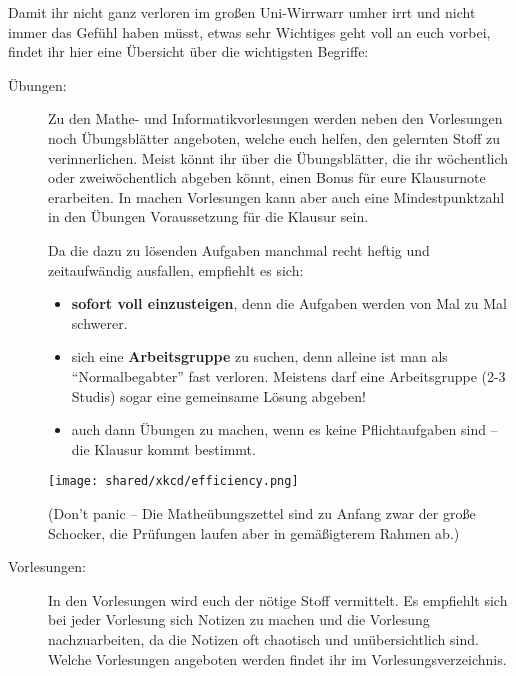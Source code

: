 Damit ihr nicht ganz verloren im gro\ss en Uni-Wirrwarr umher irrt und
  nicht immer das Gefühl haben müsst, etwas sehr Wichtiges geht
  voll an euch vorbei, findet ihr hier eine Übersicht über die wichtigsten Begriffe:

\begin{description}

\item [Übungen:] Zu den Mathe- und Informatikvorlesungen werden neben den Vorlesungen noch Übungsblätter angeboten, welche euch helfen, den gelernten Stoff zu verinnerlichen. Meist könnt ihr über die Übungsblätter, die ihr wöchentlich oder zweiwöchentlich abgeben könnt, einen Bonus für eure Klausurnote erarbeiten. In machen Vorlesungen kann aber auch eine Mindestpunktzahl in den Übungen Voraussetzung für die Klausur sein.

Da die dazu zu lösenden Aufgaben manchmal recht heftig und zeitaufwändig ausfallen, empfiehlt es sich:

\begin{itemize}

\item \textbf{sofort voll einzusteigen}, denn die Aufgaben werden von Mal
  zu Mal schwerer.

\item sich eine \textbf{Arbeitsgruppe} zu suchen, denn alleine ist man
  als "`Normalbegabter"' fast verloren. Meistens darf eine
  Arbeitsgruppe (2-3 Studis) sogar eine gemeinsame Lösung abgeben!

\item auch dann Übungen zu machen, wenn es keine Pflichtaufgaben sind --
  die Klausur kommt bestimmt.

\end {itemize}

\begin{center}
\texttt{[image: shared/xkcd/efficiency.png]}
\end{center}


(Don't panic -- Die Matheübungszettel sind zu Anfang zwar der gro\ss e
  Schocker, die Prüfungen laufen aber in gemä\ss igterem Rahmen ab.)

\item [Vorlesungen:] In den Vorlesungen wird euch der nötige Stoff vermittelt. Es empfiehlt sich bei jeder Vorlesung sich Notizen zu machen und die Vorlesung nachzuarbeiten, da die Notizen oft chaotisch und unübersichtlich sind. Welche Vorlesungen angeboten werden findet ihr im Vorlesungsverzeichnis.	%


\end{description}
